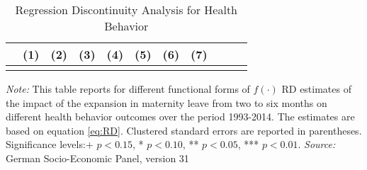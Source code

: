 \documentclass[a4paper ]{article}
\newlength\FHoffset
\begin{document}
\begin{table}[p] \centering
\def\sym#1{\ifmmode^{#1}\else\(^{#1}\)\fi}
\caption{Regression Discontinuity Analysis for Health Behavior}\label{tab:RD_HB}
\begin{tabular}{l*{10}{c}}
\toprule
 &\multicolumn{1}{c}{(1)}&\multicolumn{1}{c}{(2)}&\multicolumn{1}{c}{(3)}&\multicolumn{1}{c}{(4)}&\multicolumn{1}{c}{(5)}&\multicolumn{1}{c}{(6)}&\multicolumn{1}{c}{(7)}\\

\midrule\\
	 
 \bottomrule
\end{tabular}
\begin{minipage}{0.95\textwidth} %
{\footnotesize \textit{Note:} This table reports for different functional forms of $f(\cdot)$ RD estimates of the impact of the expansion in maternity leave from two to six months on different health behavior outcomes over the period 1993-2014. The estimates are based on equation \ref{eq:RD}.\newline
Clustered standard errors are reported in parentheses. Significance levels:+ \(p<0.15\), * \(p<0.10\), ** \(p<0.05\), *** \(p<0.01\). \newline \textit{Source: }German Socio-Economic Panel, version 31\par}
\end{minipage}
\end{table}




	
	\setlength\FHoffset{0cm} 
		\fancyheadoffset{\FHoffset}
\end{document}
